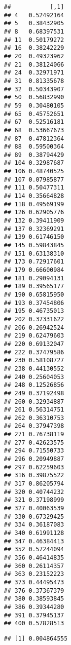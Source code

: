 \documentclass[
]{article}
\newenvironment{Shaded}{\begin{snugshade}}{\end{snugshade}}
\newcommand{\DecValTok}[1]{\textcolor[rgb]{0.00,0.00,0.81}{#1}}
\newcommand{\KeywordTok}[1]{\textcolor[rgb]{0.13,0.29,0.53}{\textbf{#1}}}
\newcommand{\NormalTok}[1]{#1}
\newcommand{\OperatorTok}[1]{\textcolor[rgb]{0.81,0.36,0.00}{\textbf{#1}}}
\newcommand{\StringTok}[1]{\textcolor[rgb]{0.31,0.60,0.02}{#1}}
\begin{document}
\begin{verbatim}
##           [,1]
## 4   0.52492164
## 5   0.38432905
## 8   0.68397531
## 11  0.50179272
## 16  0.38242229
## 20  0.49323962
## 21  0.38124066
## 24  0.32971971
## 31  0.81335678
## 32  0.50343907
## 50  0.56832990
## 59  0.30480105
## 65  0.45752651
## 67  0.52516181
## 68  0.53667673
## 87  0.47812364
## 88  0.59500364
## 89  0.38794429
## 104 0.32987687
## 106 0.48740525
## 107 0.07985877
## 111 0.50477311
## 114 0.35664828
## 118 0.49569199
## 126 0.62905776
## 132 0.39411909
## 137 0.32369291
## 139 0.61746150
## 145 0.59843845
## 151 0.63138310
## 173 0.72917601
## 179 0.66600984
## 181 0.29094131
## 189 0.39565177
## 190 0.65815950
## 193 0.37454806
## 195 0.46735013
## 202 0.37331622
## 206 0.26942524
## 219 0.62479603
## 220 0.69132047
## 222 0.37479586
## 230 0.58108727
## 238 0.44130552
## 240 0.25604053
## 248 0.12526856
## 249 0.37192498
## 260 0.32934887
## 261 0.56314751
## 262 0.36310753
## 264 0.37947398
## 271 0.76738119
## 277 0.42623575
## 294 0.71550733
## 296 0.20949887
## 297 0.62259603
## 316 0.39875522
## 317 0.86205794
## 320 0.40744232
## 321 0.37198999
## 327 0.40063539
## 330 0.67329425
## 334 0.36187083
## 340 0.61991128
## 347 0.46384413
## 352 0.57244094
## 356 0.46414835
## 360 0.26114357
## 363 0.23152223
## 373 0.44495473
## 376 0.37367379
## 380 0.38593845
## 386 0.39344280
## 391 0.37945137
## 400 0.57828513
\end{verbatim}

\begin{Shaded}
\end{Shaded}

\begin{verbatim}
## [1] 0.004864555
\end{verbatim}
\end{document}
